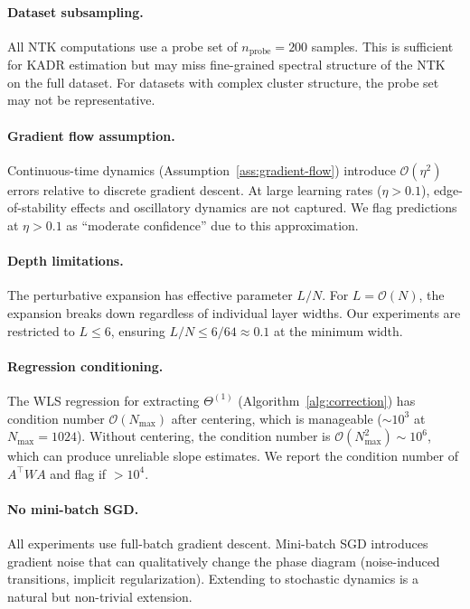\documentclass[11pt]{article}
\theoremstyle{definition}
\newcommand{\cO}{\mathcal{O}}
\renewcommand{\Theta}{\varTheta}
\begin{document}
\paragraph{Dataset subsampling.} All NTK computations use a probe set of $n_{\mathrm{probe}} = 200$ samples. This is sufficient for KADR estimation but may miss fine-grained spectral structure of the NTK on the full dataset. For datasets with complex cluster structure, the probe set may not be representative.

\paragraph{Gradient flow assumption.} Continuous-time dynamics (Assumption~\ref{ass:gradient-flow}) introduce $\cO(\eta^2)$ errors relative to discrete gradient descent. At large learning rates ($\eta > 0.1$), edge-of-stability effects and oscillatory dynamics are not captured. We flag predictions at $\eta > 0.1$ as ``moderate confidence'' due to this approximation.

\paragraph{Depth limitations.} The perturbative expansion has effective parameter $L/N$. For $L = \cO(N)$, the expansion breaks down regardless of individual layer widths. Our experiments are restricted to $L \le 6$, ensuring $L/N \le 6/64 \approx 0.1$ at the minimum width.

\paragraph{Regression conditioning.} The WLS regression for extracting $\Theta^{(1)}$ (Algorithm~\ref{alg:correction}) has condition number $\cO(N_{\max})$ after centering, which is manageable ($\sim 10^3$ at $N_{\max} = 1024$). Without centering, the condition number is $\cO(N_{\max}^2) \sim 10^6$, which can produce unreliable slope estimates. We report the condition number of $A^\top WA$ and flag if $> 10^4$.

\paragraph{No mini-batch SGD.} All experiments use full-batch gradient descent. Mini-batch SGD introduces gradient noise that can qualitatively change the phase diagram (noise-induced transitions, implicit regularization). Extending to stochastic dynamics is a natural but non-trivial extension.
\end{document}
